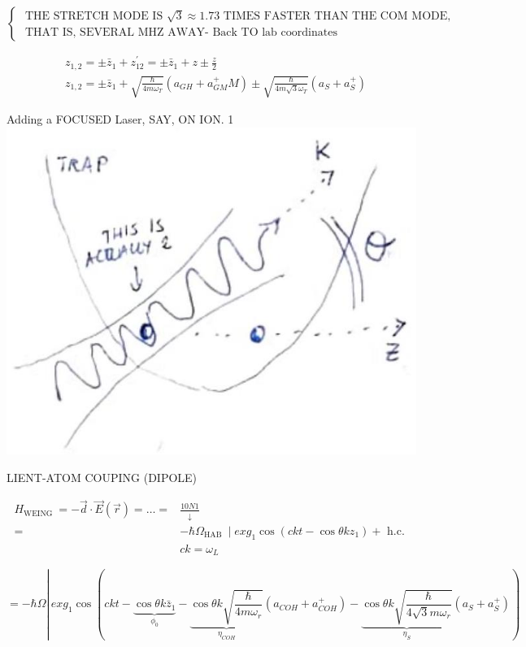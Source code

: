 \documentclass[10pt]{article}
\begin{document}
$\left\{\begin{array}{l}\text { THE STRETCH MODE IS } \sqrt{3} \approx 1.73 \text { TIMES FASTER THAN THE COM MODE, } \\ \text { THAT IS, SEVERAL MHZ AWAY- Back TO lab coordinates }\end{array}\right.$

$$
\begin{aligned}
& z_{1,2}= \pm \bar{z}_{1}+z_{12}^{\prime}= \pm \bar{z}_{1}+z \pm \frac{z}{2} \\
& z_{1,2}= \pm \bar{z}_{1}+\sqrt{\frac{\hbar}{4 m \omega_{T}}}\left(a_{G H}+a_{G M}^{+} M\right) \pm \sqrt{\frac{\hbar}{4 m \sqrt{3} \omega_{T}}}\left(a_{S}+a_{S}^{+}\right)
\end{aligned}
$$

Adding a FOCUSED Laser, SAY, ON ION. 1\\
\includegraphics[max width=\textwidth, center]{2025_10_16_f28de32ab20bd0ac9bbfg-3(1)}

LIENT-ATOM COUPING (DIPOLE)

$$
\begin{aligned}
H_{\text {WEING }}=-\vec{d} \cdot \vec{E}(\vec{r})=\ldots= & \frac{10 N 1}{\downarrow} \\
= & -\hbar \Omega_{\text {HAB }} \mid e x g_{1} \cos \left(c k t-\cos \theta k z_{1}\right)+\text { h.c. } \\
& c k=\omega_{L}
\end{aligned}
$$

$$
=-\hbar \Omega \left\lvert\, e x g_{1} \cos (c k t-\underbrace{\cos \theta k \bar{z}_{1}}_{\phi_{0}}-\underbrace{\cos \theta k \sqrt{\frac{\hbar}{4 m \omega_{r}}}}_{\eta_{C O H}}\left(a_{C O H}+a_{C O H}^{+}\right)-\underbrace{\cos \theta k \sqrt{\frac{\hbar}{4 \sqrt{3} m \omega_{r}}}}_{\eta_{S}}\left(a_{S}+a_{S}^{+}\right))\right.
$$
\end{document}
